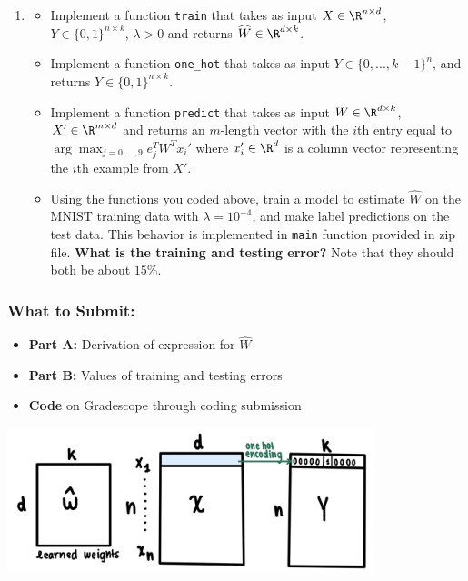 \documentclass{article}
\begin{document}
\begin{aprob}
\begin{enumerate}
        \item {} 
        \begin{itemize}
            \item Implement a function \verb|train| that takes as input $X \in\R^{n \times d}$, $Y \in \{0,1\}^{n \times k}$, $\lambda > 0$ and returns $\widehat{W} \in \R^{d \times k}$.
            \item Implement a function \verb|one_hot| that takes as input $Y \in \{0, ..., k-1\}^{n}$, and returns $Y \in \{0,1\}^{n \times k}$.
            \item Implement a function  \verb|predict| that takes as input $W \in \R^{d \times k}$, $X' \in\R^{m \times d}$ and returns an $m$-length vector with the $i$th entry equal to $\arg\max_{j=0,\dots,9} e_j^T W^T x_i'$ where $x_i' \in \R^d$ is a column vector representing the $i$th example from $X'$.
            \item Using the functions you coded above, train a model to estimate $\widehat{W}$ on the MNIST training data with $\lambda = 10^{-4}$, and make label predictions on the test data. This behavior is implemented in \verb|main| function provided in zip file. {\bf What is the training and testing error?} Note that they should both be about $15\%$. 
        \end{itemize}
    \end{enumerate}
    
    \subsubsection*{What to Submit:}
    \begin{itemize}
        \item \textbf{Part A:} Derivation of expression for $\widehat{W}$
        \item \textbf{Part B:} Values of training and testing errors
        \item \textbf{Code} on Gradescope through coding submission
    \end{itemize}
    \begin{tcolorbox}[colback=lightgray!10!white, colframe=black, title=A5.a, breakable]
        \begin{center}
            \includegraphics[width=0.8\textwidth]{A5dimensions.png}
        \end{center}
        

\end{tcolorbox}
\end{aprob}
\end{document}
